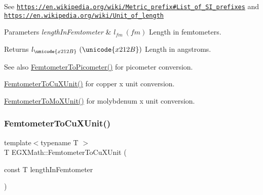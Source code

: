 See \href{https://en.wikipedia.org/wiki/Metric_prefix#List_of_SI_prefixes}{\tt https\+://en.\+wikipedia.\+org/wiki/\+Metric\+\_\+prefix\#\+List\+\_\+of\+\_\+\+S\+I\+\_\+prefixes} and \href{https://en.wikipedia.org/wiki/Unit_of_length}{\tt https\+://en.\+wikipedia.\+org/wiki/\+Unit\+\_\+of\+\_\+length} 
\begin{DoxyParams}{Parameters}
{\em length\+In\+Femtometer} & $ l_{fm}\ (fm)$ Length in femtometers. \\
\hline
\end{DoxyParams}
\begin{DoxyReturn}{Returns}
$ l_{\unicode{x212B}}\ (\unicode{x212B})$ Length in angstroms. 
\end{DoxyReturn}
\begin{DoxySeeAlso}{See also}
\mbox{\hyperlink{group___e_g_x_math-_conversions-_length_conversions-_femtometer-_s_i_gadfcd6b374d4134cad0ac1ce7a8e50509}{Femtometer\+To\+Picometer()}} for picometer conversion. 

\mbox{\hyperlink{group___e_g_x_math-_conversions-_length_conversions-_femtometer-_non-_s_i_ga59bde341fe80506851e39cd2ceb3747b}{Femtometer\+To\+Cu\+X\+Unit()}} for copper x unit conversion. 

\mbox{\hyperlink{group___e_g_x_math-_conversions-_length_conversions-_femtometer-_non-_s_i_ga57801d7c681362c1a11053233e31c415}{Femtometer\+To\+Mo\+X\+Unit()}} for molybdenum x unit conversion. 
\end{DoxySeeAlso}
\mbox{\label{group___e_g_x_math-_conversions-_length_conversions-_femtometer-_non-_s_i_ga59bde341fe80506851e39cd2ceb3747b}} 
\subsubsection{\texorpdfstring{Femtometer\+To\+Cu\+X\+Unit()}{FemtometerToCuXUnit()}}
{\footnotesize\ttfamily template$<$typename T $>$ \\
T E\+G\+X\+Math\+::\+Femtometer\+To\+Cu\+X\+Unit (\begin{DoxyParamCaption}\item[{const T}]{length\+In\+Femtometer }\end{DoxyParamCaption})}



